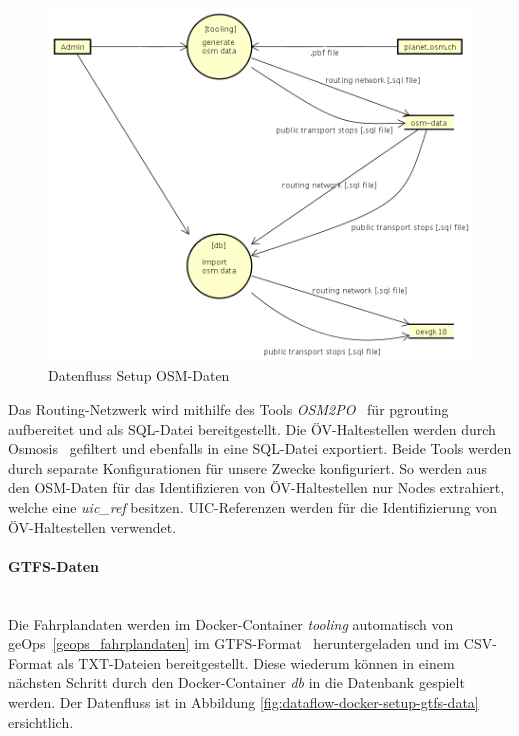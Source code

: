 \begin{figure}[ht]
    \centering
    \includegraphics[width=0.8\linewidth]{projectdoc/img/dataflow-docker-setup-osm-data.png}
    \caption[Datenfluss Setup OSM-Daten]{Datenfluss Setup OSM-Daten}
    \label{fig:dataflow-docker-setup-osm-data}
\end{figure}

Das Routing-Netzwerk wird mithilfe des Tools \emph{OSM2PO}~\cite{OSM2PO} für pgrouting aufbereitet und als SQL-Datei bereitgestellt.
Die \acs{ÖV}-Haltestellen werden durch Osmosis~\cite{osmosis} gefiltert und ebenfalls in eine SQL-Datei exportiert.
Beide Tools werden durch separate Konfigurationen für unsere Zwecke konfiguriert.
So werden aus den \acs{OSM}-Daten für das Identifizieren von \acs{ÖV}-Haltestellen nur Nodes extrahiert, welche eine \emph{uic\_ref} besitzen. \ac{UIC}-Referenzen werden für die Identifizierung von \acs{ÖV}-Haltestellen verwendet.

\paragraph{GTFS-Daten}~\\
Die Fahrplandaten werden im Docker-Container \emph{tooling} automatisch von geOps~\ref{geops_fahrplandaten} im GTFS-Format~\cite{gtfs_spec} heruntergeladen und im CSV-Format als TXT-Dateien bereitgestellt.
Diese wiederum können in einem nächsten Schritt durch den Docker-Container \emph{db} in die Datenbank gespielt werden.
Der Datenfluss ist in Abbildung \ref{fig:dataflow-docker-setup-gtfs-data} ersichtlich.

